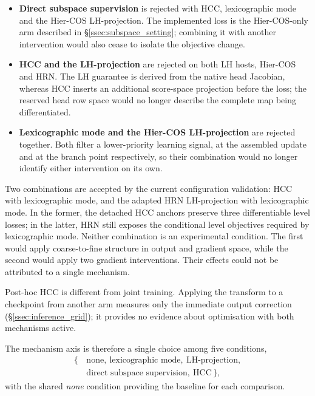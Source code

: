 \begin{itemize}
    \item \textbf{Direct subspace supervision} is rejected with HCC,
    lexicographic mode and the Hier-COS LH-projection. The implemented loss is
    the Hier-COS-only arm described in \S\ref{ssec:subspace_setting}; combining
    it with another intervention would also cease to isolate the objective
    change.
    \item \textbf{HCC and the LH-projection} are rejected on both LH hosts,
    Hier-COS and HRN. The LH guarantee is derived from the native head Jacobian,
    whereas HCC inserts an additional score-space projection before the loss;
    the reserved head row space would no longer describe the complete map being
    differentiated.
    \item \textbf{Lexicographic mode and the Hier-COS LH-projection} are
    rejected together. Both filter a lower-priority learning signal, at the
    assembled update and at the branch point respectively, so their combination
    would no longer identify either intervention on its own.
\end{itemize}

Two combinations are accepted by the current configuration validation: HCC
with lexicographic mode, and the adapted HRN LH-projection with lexicographic
mode. In the former, the detached HCC anchors preserve three differentiable
level losses; in the latter, HRN still exposes the conditional level objectives
required by lexicographic mode. Neither combination is an experimental
condition. The first would
apply coarse-to-fine structure in output and gradient space, while the second
would apply two gradient interventions. Their effects could not be attributed
to a single mechanism.

Post-hoc HCC is different from joint training. Applying the transform to a
checkpoint from another arm measures only the immediate output correction
(\S\ref{ssec:inference_grid}); it provides no evidence about optimisation with
both mechanisms active.

The mechanism axis is therefore a single choice among five conditions,
\[
\begin{aligned}
\big\{\,&\text{none},\ \text{lexicographic mode},\ \text{LH-projection},\\
&\text{direct subspace supervision},\ \text{HCC}\,\big\},
\end{aligned}
\]
with the shared \emph{none} condition providing the baseline for each
comparison.

